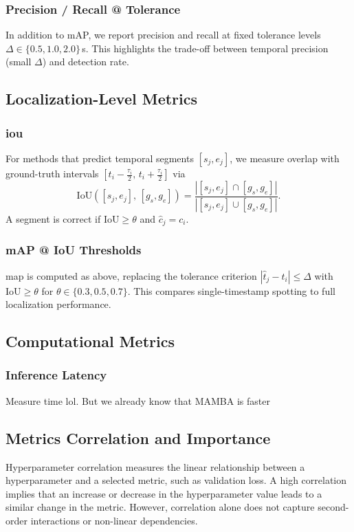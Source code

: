 \subsubsection{Precision / Recall @ Tolerance}
In addition to mAP, we report precision and recall at fixed tolerance levels $\Delta\in\{0.5,1.0,2.0\}$\,s. This highlights the trade-off between temporal precision (small $\Delta$) and detection rate.

\subsection{Localization-Level Metrics}
\subsubsection{\acrfull{iou}}
For methods that predict temporal segments $[s_j,e_j]$, we measure overlap with ground-truth intervals $[t_i-\tfrac{\tau_i}{2},\,t_i+\tfrac{\tau_i}{2}]$ via
\[
\mathrm{IoU}([s_j,e_j],\,[g_s,g_e]) 
= \frac{|[s_j,e_j]\cap [g_s,g_e]|}{|[s_j,e_j]\cup [g_s,g_e]|}.
\]
A segment is correct if $\mathrm{IoU}\!\ge\theta$ and $\hat c_j=c_i$.

\subsubsection{mAP @ IoU Thresholds}
\acrshort{map} is computed as above, replacing the tolerance criterion $|\hat t_j - t_i|\le\Delta$ with $\mathrm{IoU}\ge\theta$ for $\theta\in\{0.3,0.5,0.7\}$. This compares single-timestamp spotting to full localization performance.

\subsection{Computational Metrics} 
\subsubsection{Inference Latency} 
Measure time lol. But we already know that MAMBA is faster 

\subsection{Metrics Correlation and Importance}

Hyperparameter correlation measures the linear relationship between a hyperparameter and a selected metric, such as validation loss. A high correlation implies that an increase or decrease in the hyperparameter value leads to a similar change in the metric. However, correlation alone does not capture second-order interactions or non-linear dependencies.


